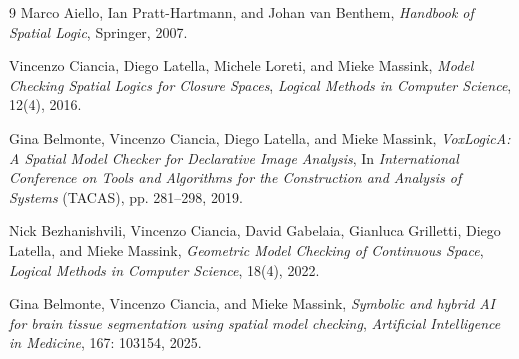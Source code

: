\documentclass[11pt,a4paper]{article}
\begin{document}
\begin{thebibliography}{9}
    Marco Aiello, Ian Pratt-Hartmann, and Johan van Benthem,
    \textit{Handbook of Spatial Logic},
    Springer, 2007.

    Vincenzo Ciancia, Diego Latella, Michele Loreti, and Mieke Massink,
    \textit{Model Checking Spatial Logics for Closure Spaces},
    \textit{Logical Methods in Computer Science}, 12(4), 2016.

    Gina Belmonte, Vincenzo Ciancia, Diego Latella, and Mieke Massink,
    \textit{VoxLogicA: A Spatial Model Checker for Declarative Image Analysis},
    In \textit{International Conference on Tools and Algorithms for the Construction and Analysis of Systems} (TACAS), pp. 281--298, 2019.

    Nick Bezhanishvili, Vincenzo Ciancia, David Gabelaia, Gianluca Grilletti, Diego Latella, and Mieke Massink,
    \textit{Geometric Model Checking of Continuous Space},
    \textit{Logical Methods in Computer Science}, 18(4), 2022.

    Gina Belmonte, Vincenzo Ciancia, and Mieke Massink,
    \textit{Symbolic and hybrid AI for brain tissue segmentation using spatial model checking},
    \textit{Artificial Intelligence in Medicine}, 167: 103154, 2025.
\end{thebibliography}
\end{document}
